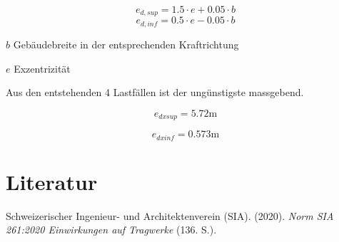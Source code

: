\documentclass[
  letterpaper,
  DIV=11]{scrreprt}
\newlength{\cslhangindent}
\newlength{\cslentryspacingunit} %
\newenvironment{CSLReferences}[2] %
 {%
  \setlength{\parindent}{0pt}
  \ifodd #1
  \let\oldpar\par
  \def\par{\hangindent=\cslhangindent\oldpar}
  \fi
  \setlength{\parskip}{#2\cslentryspacingunit}
 }%
 {}
\begin{document}
\[e_{d,sup} = 1.5\cdot e+0.05\cdot b\]
\[e_{d,inf} = 0.5\cdot e-0.05\cdot b\]

\(b\) Gebäudebreite in der entsprechenden Kraftrichtung

\(e\) Exzentrizität

Aus den entstehenden 4 Lastfällen ist der ungünstigste massgebend.

\begin{equation*}e_{dxsup} = 5.72 \text{m}\end{equation*}

\begin{equation*}e_{dxinf} = 0.573 \text{m}\end{equation*}


\hypertarget{literatur}{%
\chapter*{Literatur}\label{literatur}}


\hypertarget{refs}{}
\begin{CSLReferences}{1}{0}
\leavevmode{}%
Schweizerischer Ingenieur- und Architektenverein (SIA). (2020).
\emph{{Norm SIA 261:2020 Einwirkungen auf Tragwerke }} (136. S.).

\end{CSLReferences}
\end{document}
